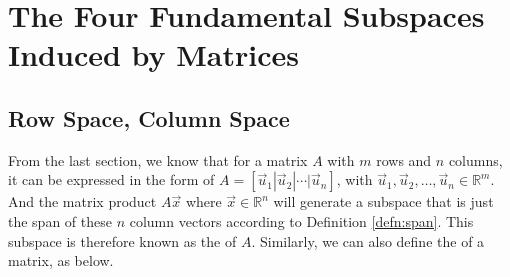
\section{The Four Fundamental Subspaces Induced by Matrices}

\subsection{Row Space, Column Space}

From the last section, we know that for a matrix $A$ with $m$ rows and $n$ columns, it can be expressed in the form of $A = [\vec{u}_1|\vec{u}_2|\cdots|\vec{u}_n]$, with $\vec{u}_1, \vec{u}_2, \ldots, \vec{u}_n \in \mathbb{R}^m$. And the matrix product $A\vec{x}$ where $\vec{x} \in \mathbb{R}^n$ will generate a subspace that is just the span of these $n$ column vectors according to Definition \ref{defn:span}. This subspace is therefore known as the  of $A$. Similarly, we can also define the  of a matrix, as below.

